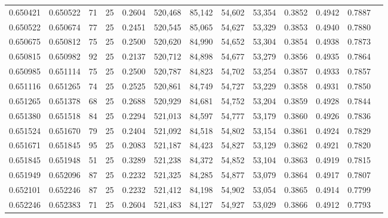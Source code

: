 \begin{tabular}{rrrrrrrrrrrrr}
0.650421 & 0.650522 &    71 &  25 &                                     0.2604 & 520,468 &  85,142 &  54,602 &  53,354 & 0.3852 & 0.4942 & 0.7887 \\
0.650522 & 0.650674 &    77 &  25 &                                     0.2451 & 520,545 &  85,065 &  54,627 &  53,329 & 0.3853 & 0.4940 & 0.7880 \\
0.650675 & 0.650812 &    75 &  25 &                                     0.2500 & 520,620 &  84,990 &  54,652 &  53,304 & 0.3854 & 0.4938 & 0.7873 \\
0.650815 & 0.650982 &    92 &  25 &                                     0.2137 & 520,712 &  84,898 &  54,677 &  53,279 & 0.3856 & 0.4935 & 0.7864 \\
0.650985 & 0.651114 &    75 &  25 &                                     0.2500 & 520,787 &  84,823 &  54,702 &  53,254 & 0.3857 & 0.4933 & 0.7857 \\
0.651116 & 0.651265 &    74 &  25 &                                     0.2525 & 520,861 &  84,749 &  54,727 &  53,229 & 0.3858 & 0.4931 & 0.7850 \\
0.651265 & 0.651378 &    68 &  25 &                                     0.2688 & 520,929 &  84,681 &  54,752 &  53,204 & 0.3859 & 0.4928 & 0.7844 \\
0.651380 & 0.651518 &    84 &  25 &                                     0.2294 & 521,013 &  84,597 &  54,777 &  53,179 & 0.3860 & 0.4926 & 0.7836 \\
0.651524 & 0.651670 &    79 &  25 &                                     0.2404 & 521,092 &  84,518 &  54,802 &  53,154 & 0.3861 & 0.4924 & 0.7829 \\
0.651671 & 0.651845 &    95 &  25 &                                     0.2083 & 521,187 &  84,423 &  54,827 &  53,129 & 0.3862 & 0.4921 & 0.7820 \\
0.651845 & 0.651948 &    51 &  25 &                                     0.3289 & 521,238 &  84,372 &  54,852 &  53,104 & 0.3863 & 0.4919 & 0.7815 \\
0.651949 & 0.652096 &    87 &  25 &                                     0.2232 & 521,325 &  84,285 &  54,877 &  53,079 & 0.3864 & 0.4917 & 0.7807 \\
0.652101 & 0.652246 &    87 &  25 &                                     0.2232 & 521,412 &  84,198 &  54,902 &  53,054 & 0.3865 & 0.4914 & 0.7799 \\
0.652246 & 0.652383 &    71 &  25 &                                     0.2604 & 521,483 &  84,127 &  54,927 &  53,029 & 0.3866 & 0.4912 & 0.7793 \\

\end{tabular}
